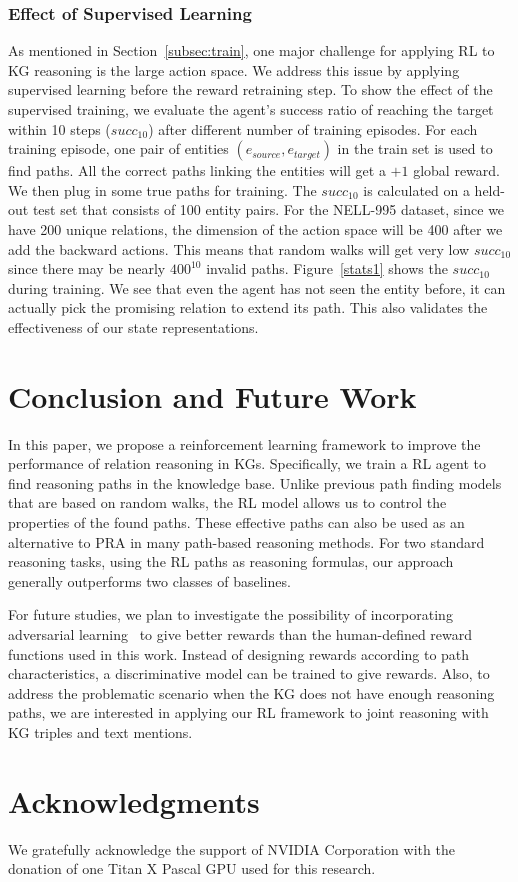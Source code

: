 \documentclass[11pt,letterpaper]{article}
\begin{document}
\subsubsection{Effect of Supervised Learning}
As mentioned in Section~\ref{subsec:train}, one major challenge for applying RL to KG reasoning is the large action space. We address this issue by applying supervised learning before the reward retraining step. To show the effect of the supervised training, we evaluate the agent's success ratio of reaching the target within 10 steps ($succ_{10}$) after different number of training episodes. For each training episode, one pair of entities $(e_{source},e_{target})$ in the train set is used to find paths. All the correct paths linking the entities will get a $+1$ global reward. We then plug in some true paths for training. The $succ_{10}$ is calculated on a held-out test set that consists of 100 entity pairs. For the NELL-995 dataset, since we have 200 unique relations, the dimension of the action space will be 400 after we add the backward actions. This means that random walks will get very low $succ_{10}$ since there may be nearly $400^{10}$ invalid paths. Figure~\ref{stats1} shows the $succ_{10}$ during training. We see that even the agent has not seen the entity before, it can actually pick the promising relation to extend its path. This also validates the effectiveness of our state representations.

\section{Conclusion and Future Work}
\label{sec:conclude}
In this paper, we propose a reinforcement learning framework to improve the performance of relation reasoning in KGs. Specifically, we train a RL agent to find reasoning paths in the knowledge base. Unlike previous path finding models that are based on random walks, the RL model allows us to control the properties of the found paths. These effective paths can also be used as an alternative to PRA in many path-based reasoning methods. For two standard reasoning tasks, using the RL paths as reasoning formulas, our approach generally outperforms two classes of baselines. 

For future studies, we plan to investigate the possibility of incorporating adversarial learning~\cite{goodfellow2014generative} to give better rewards than the human-defined reward functions used in this work. Instead of designing rewards according to path characteristics, a discriminative model can be trained to give rewards. Also, to address the problematic scenario when the KG does not have enough reasoning paths, we are interested in applying our RL framework to joint reasoning with KG triples and text mentions.

\section*{Acknowledgments}
We gratefully acknowledge the support of NVIDIA Corporation with the donation of one Titan X Pascal GPU used for this research.



\end{document}
